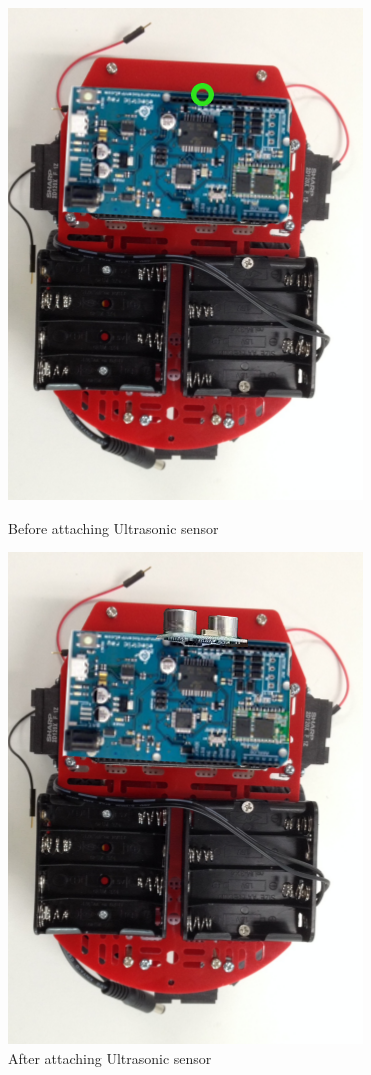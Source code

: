 \begin{figure}[h]
\centering
\includegraphics[width=0.4\columnwidth]{Images/Assembly/10a}
\caption{ Before attaching Ultrasonic sensor}
\vspace{2mm}
\includegraphics[width=0.4\columnwidth]{Images/Assembly/10b}
\caption{ After attaching Ultrasonic sensor}
\label{fig:sensor}
\end{figure}
